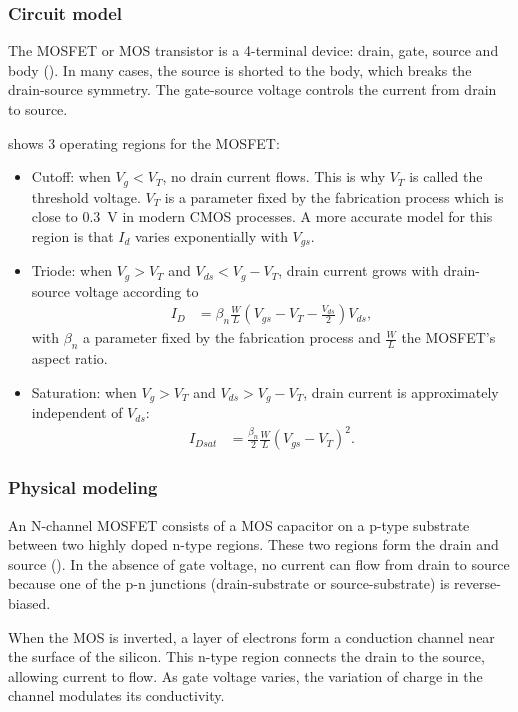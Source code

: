 \subsubsection{Circuit model}
\label{section:ecuaciones_mos}
The MOSFET or MOS transistor is a 4-terminal device:
drain, gate, source and body ().
In many cases, the source is shorted to the body,
which breaks the drain-source symmetry.
The gate-source voltage controls the current from drain to source.

 shows 3 operating regions for the MOSFET:
\begin{itemize}
    \item Cutoff: when $V_g<V_T$, no drain current flows.
        This is why $V_T$ is called the threshold voltage.
        $V_T$ is a parameter fixed by the fabrication process
        which is close to \SI{.3}{\volt} in modern CMOS processes.
        A more accurate model for this region is that $I_d$ varies
        exponentially with $V_{gs}$.
    \item Triode: when $V_g>V_T$ and $V_{ds}<V_g-V_T$, 
        drain current grows with drain-source voltage according to
        \begin{align*}
            I_D&=\beta_n\frac WL(V_{gs}-V_T-\frac{V_{ds}}2)V_{ds},
        \end{align*}
        with $\beta_n$ a parameter fixed by the fabrication process
        and $\frac WL$ the MOSFET's aspect ratio.
    \item Saturation: when $V_g>V_T$ and $V_{ds}>V_g-V_T$,
        drain current is approximately independent of $V_{ds}$:
        \begin{align*}
            I_{Dsat}&=\frac{\beta_n}2\frac WL(V_{gs}-V_T)^2.
        \end{align*}
\end{itemize}
%
\subsubsection{Physical modeling}
An N-channel MOSFET consists of a MOS capacitor on a p-type substrate
between two highly doped n-type regions.
These two regions form the drain and source ().
In the absence of gate voltage,
no current can flow from drain to source because 
one of the p-n junctions (drain-substrate or source-substrate) is reverse-biased.

When the MOS is inverted,
a layer of electrons form a conduction channel near the surface of the silicon.
This n-type region connects the drain to the source, allowing current to flow.
As gate voltage varies,
the variation of charge in the channel modulates its conductivity.
